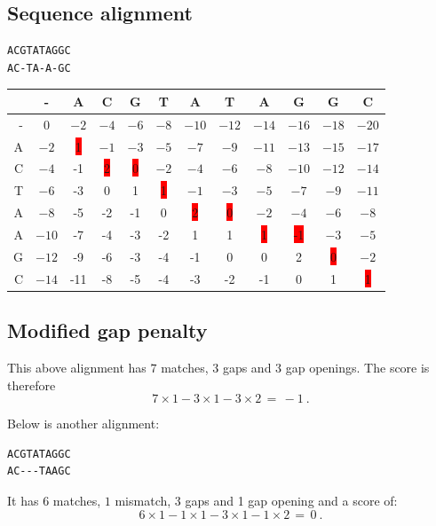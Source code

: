\documentclass[a4paper,11pt]{article}
\begin{document}
\subsection*{Sequence alignment}
\begin{verbatim}
ACGTATAGGC
AC-TA-A-GC
\end{verbatim}
\begin{table}[ht]
  \begin{center}
    \begin{tabular}{rccccccccccc}
      \toprule
      & - & A & C & G & T & A & T & A & G & G & C\\
      \midrule
      - & $0$ & $-2$ & $-4$ & $-6$ & $-8$ & $-10$ & $-12$ & $-14$ & $-16$ & $-18$ & $-20$\\
      A & $-2$ & \colorbox{red}{1} & $-1$ & $-3$ & $-5$ & $-7$ & $-9$ & $-11$ & $-13$ & $-15$ & $-17$\\
      C & $-4$ & -1 & \colorbox{red}{2} & \colorbox{red}{0} & $-2$ & $-4$ & $-6$ & $-8$ & $-10$ & $-12$ & $-14$\\
      T & $-6$ & -3 & 0 & 1 & \colorbox{red}{1} & $-1$ & $-3$ & $-5$ & $-7$ & $-9$ & $-11$\\
      A & $-8$ & -5 & -2 & -1 & 0 & \colorbox{red}{2} & \colorbox{red}{0} & $-2$ & $-4$ & $-6$ & $-8$\\
      A & $-10$ & -7 & -4 & -3 & -2 & 1 & 1 & \colorbox{red}{1} & \colorbox{red}{-1} & $-3$ & $-5$\\
      G & $-12$ & -9 & -6 & -3 & -4 & -1 & 0 & 0 & 2 & \colorbox{red}{0} & $-2$\\
      C & $-14$ & -11 & -8 & -5 & -4 & -3 & -2 & -1 & 0 & 1 & \colorbox{red}{1}\\
      \bottomrule
    \end{tabular}
  \end{center}
\end{table}

\subsection*{Modified gap penalty}

This above alignment has $7$ matches, $3$ gaps and $3$ gap
openings. The score is therefore
$$
7\times 1-3\times 1-3\times 2\,=\,-1~.
$$

Below is another alignment:
\begin{verbatim}
ACGTATAGGC
AC---TAAGC
\end{verbatim}
It has $6$ matches, $1$ mismatch, $3$ gaps and 1 gap opening and a
score of:
$$
6\times 1-1\times 1-3\times 1-1\times 2\,=\,0~.
$$
\end{document}
